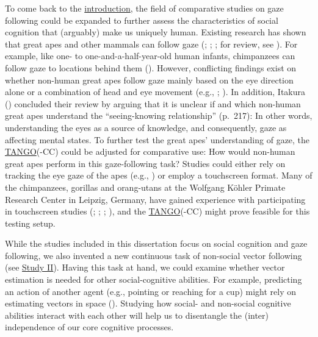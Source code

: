 \documentclass[
]{scrbook}
\begin{document}
To come back to the \hyperref[introduction]{introduction}, the field of comparative studies on gaze following could be expanded to further assess the characteristics of social cognition that (arguably) make us uniquely human. Existing research has shown that great apes and other mammals can follow gaze (; ; ; for review, see ). For example, like one- to one-and-a-half-year-old human infants, chimpanzees can follow gaze to locations behind them (). However, conflicting findings exist on whether non-human great apes follow gaze mainly based on the eye direction alone or a combination of head and eye movement (e.g., ; ). In addition, Itakura () concluded their review by arguing that it is unclear if and which non-human great apes understand the ``seeing-knowing relationship'' (p.~217): In other words, understanding the eyes as a source of knowledge, and consequently, gaze as affecting mental states. To further test the great apes' understanding of gaze, the \hyperref[acronyms_TANGO]{TANGO}(-CC) could be adjusted for comparative use: How would non-human great apes perform in this gaze-following task? Studies could either rely on tracking the eye gaze of the apes (e.g., ) or employ a touchscreen format. Many of the chimpanzees, gorillas and orang-utans at the Wolfgang Köhler Primate Research Center in Leipzig, Germany, have gained experience with participating in touchscreen studies (; ; ; ), and the \hyperref[acronyms_TANGO]{TANGO}(-CC) might prove feasible for this testing setup.

While the studies included in this dissertation focus on social cognition and gaze following, we also invented a new continuous task of non-social vector following (see \hyperref[studyII]{Study II}). Having this task at hand, we could examine whether vector estimation is needed for other social-cognitive abilities. For example, predicting an action of another agent (e.g., pointing or reaching for a cup) might rely on estimating vectors in space (). Studying how social- and non-social cognitive abilities interact with each other will help us to disentangle the (inter) independence of our core cognitive processes.
\end{document}
